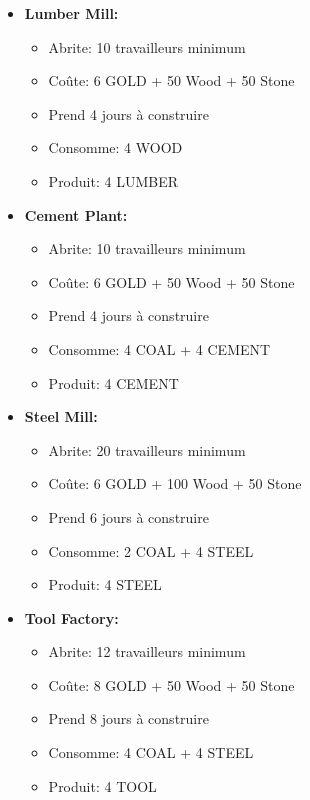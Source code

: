 \documentclass[a4paper,11pt]{article}
\begin{document}
\begin{itemize}
	\item \textbf{Lumber Mill:}
	      \begin{itemize}
		      \item Abrite: 10 travailleurs minimum
		      \item Coûte: 6 GOLD + 50 Wood + 50 Stone
		      \item Prend 4 jours à construire
		      \item Consomme: 4 WOOD
		      \item Produit: 4 LUMBER
	      \end{itemize}

	\item \textbf{Cement Plant:}
	      \begin{itemize}
		      \item Abrite: 10 travailleurs minimum
		      \item Coûte: 6 GOLD + 50 Wood + 50 Stone
		      \item Prend 4 jours à construire
		      \item Consomme: 4 COAL + 4 CEMENT
		      \item Produit: 4 CEMENT
	      \end{itemize}

	\item \textbf{Steel Mill:}
	      \begin{itemize}
		      \item Abrite: 20 travailleurs minimum
		      \item Coûte: 6 GOLD + 100 Wood + 50 Stone
		      \item Prend 6 jours à construire
		      \item Consomme: 2 COAL + 4 STEEL
		      \item Produit: 4 STEEL
	      \end{itemize}

	\item \textbf{Tool Factory:}
	      \begin{itemize}
		      \item Abrite: 12 travailleurs minimum
		      \item Coûte: 8 GOLD + 50 Wood + 50 Stone
		      \item Prend 8 jours à construire
		      \item Consomme: 4 COAL + 4 STEEL
		      \item Produit: 4 TOOL
	      \end{itemize}
\end{itemize}
\end{document}
